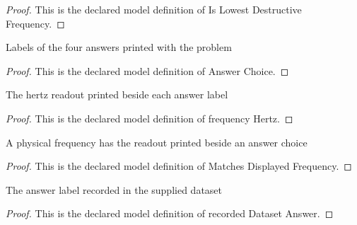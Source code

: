 \begin{proof}
  This is the declared model definition of Is Lowest Destructive Frequency.
\end{proof}
\begin{definition}
  \label{def:physics:phyx-mini-0170:phyxminiproblems-problemphyxmini0170-answerchoice}
  Labels of the four answers printed with the problem
\end{definition}
\begin{proof}
  This is the declared model definition of Answer Choice.
\end{proof}
\begin{definition}
  \label{def:physics:phyx-mini-0170:phyxminiproblems-problemphyxmini0170-answerchoice-frequencyhertz}
  The hertz readout printed beside each answer label
\end{definition}
\begin{proof}
  This is the declared model definition of frequency Hertz.
\end{proof}
\begin{definition}
  \label{def:physics:phyx-mini-0170:phyxminiproblems-problemphyxmini0170-matchesdisplayedfrequency}
  A physical frequency has the readout printed beside an answer choice
\end{definition}
\begin{proof}
  This is the declared model definition of Matches Displayed Frequency.
\end{proof}
\begin{definition}
  \label{def:physics:phyx-mini-0170:phyxminiproblems-problemphyxmini0170-recordeddatasetanswer}
  The answer label recorded in the supplied dataset
\end{definition}
\begin{proof}
  This is the declared model definition of recorded Dataset Answer.
\end{proof}
